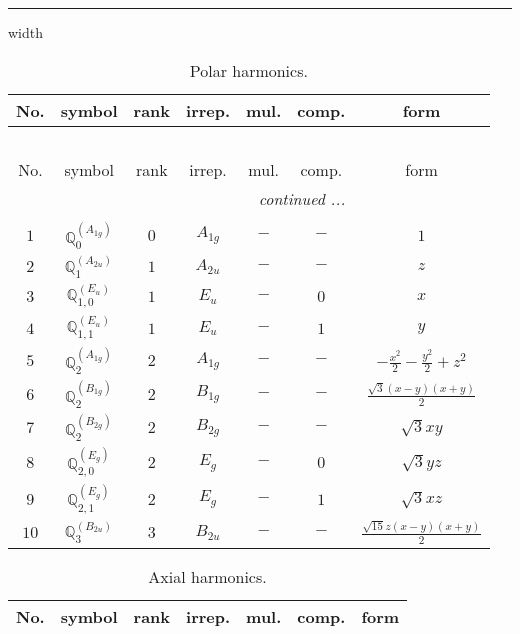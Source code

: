 \documentclass[fleqn,10pt,landscape]{article}
\begin{document}
\begin{itemize}
 \hfil \hrule height 1mm width \textwidth \hfil

\begin{center}
\renewcommand{\arraystretch}{1.3}
\begin{longtable}{ccccccc}
\caption{Polar harmonics.}
 \\
 \hline \hline
No. & symbol & rank & irrep. & mul. & comp. & form \\ \hline \endfirsthead

\multicolumn{6}{l}{\tablename\ \thetable{}} \\
 \hline \hline
No. & symbol & rank & irrep. & mul. & comp. & form \\ \hline \endhead

 \hline \hline
\multicolumn{6}{r}{\footnotesize\it continued ...} \\ \endfoot

 \hline \hline
\multicolumn{6}{r}{} \\ \endlastfoot

$ 1 $ & $ \mathbb{Q}_{0}^{(A_{1g})} $ & $ 0 $ & $ A_{1g} $ & $ - $ & $ - $ & $ 1 $ \\ \hline
$ 2 $ & $ \mathbb{Q}_{1}^{(A_{2u})} $ & $ 1 $ & $ A_{2u} $ & $ - $ & $ - $ & $ z $ \\
$ 3 $ & $ \mathbb{Q}_{1,0}^{(E_{u})} $ & $ 1 $ & $ E_{u} $ & $ - $ & $ 0 $ & $ x $ \\
$ 4 $ & $ \mathbb{Q}_{1,1}^{(E_{u})} $ & $ 1 $ & $ E_{u} $ & $ - $ & $ 1 $ & $ y $ \\ \hline
$ 5 $ & $ \mathbb{Q}_{2}^{(A_{1g})} $ & $ 2 $ & $ A_{1g} $ & $ - $ & $ - $ & $ - \frac{x^{2}}{2} - \frac{y^{2}}{2} + z^{2} $ \\
$ 6 $ & $ \mathbb{Q}_{2}^{(B_{1g})} $ & $ 2 $ & $ B_{1g} $ & $ - $ & $ - $ & $ \frac{\sqrt{3} \left(x - y\right) \left(x + y\right)}{2} $ \\
$ 7 $ & $ \mathbb{Q}_{2}^{(B_{2g})} $ & $ 2 $ & $ B_{2g} $ & $ - $ & $ - $ & $ \sqrt{3} x y $ \\
$ 8 $ & $ \mathbb{Q}_{2,0}^{(E_{g})} $ & $ 2 $ & $ E_{g} $ & $ - $ & $ 0 $ & $ \sqrt{3} y z $ \\
$ 9 $ & $ \mathbb{Q}_{2,1}^{(E_{g})} $ & $ 2 $ & $ E_{g} $ & $ - $ & $ 1 $ & $ \sqrt{3} x z $ \\ \hline
$ 10 $ & $ \mathbb{Q}_{3}^{(B_{2u})} $ & $ 3 $ & $ B_{2u} $ & $ - $ & $ - $ & $ \frac{\sqrt{15} z \left(x - y\right) \left(x + y\right)}{2} $ \\
\end{longtable}
\end{center}
\begin{center}
\renewcommand{\arraystretch}{1.3}
\begin{longtable}{ccccccc}
\caption{Axial harmonics.}
 \\
 \hline \hline
No. & symbol & rank & irrep. & mul. & comp. & form \\ \hline \endfirsthead


\end{longtable}
\end{center}
\end{itemize}
\end{document}
